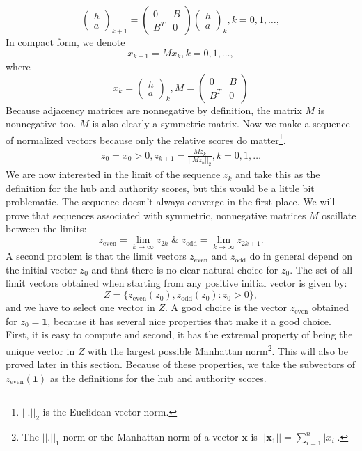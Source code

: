 \documentclass[a4paper,11pt]{report}
\begin{document}
$$\begin{pmatrix} 
h\\
a
\end{pmatrix}_{k+1} = \begin{pmatrix} 
0 & B\\
B^T & 0
\end{pmatrix} \begin{pmatrix} 
h\\
a
\end{pmatrix}_{k}, k = 0, 1,\ldots,$$
In compact form, we denote
$$x_{k+1} = Mx_k, k= 0,1,\ldots,$$
where 
$$x_k = \begin{pmatrix} 
h\\
a
\end{pmatrix}_{k}, M =  \begin{pmatrix} 
0 & B\\
B^T & 0
\end{pmatrix}$$
Because adjacency matrices are nonnegative by definition, the matrix $M$ is 
nonnegative too. $M$ is also clearly a symmetric matrix. Now we make a sequence 
of normalized vectors because only the relative scores do matter\footnote{$||.||_2$ is the Euclidean vector norm.}. 
\begin{eqnarray}\label{sequencezk}
  z_0 = x_0 > 0, z_{k+1} = \frac{Mz_k}{||Mz_k||_2}, k = 0,1,\ldots
\end{eqnarray}
We are now interested in the limit of the sequence $z_k$ and take this as the definition for
the hub and authority scores, but this would be a little bit problematic. The sequence doesn't always converge in the first place. We will prove that 
sequences associated with symmetric, nonnegative matrices $M$ oscillate between the 
limits:
$$z_{\text{even}} = \lim_{k \to \infty} z_{2k} \; \& \; z_{\text{odd}} = \lim_{k \to \infty} z_{2k+1}.$$
A second problem is that the limit vectors $z_{\text{even}}$ and $z_{\text{odd}}$ 
do in general depend on the initial vector $z_0$ and that there is no clear 
natural choice for $z_0$. The set of all limit vectors obtained when starting 
from any positive initial vector is given by:
$$Z = \{z_{\text{even}}(z_0), z_{\text{odd}}(z_0): z_0 > 0\},$$
and we have to select one vector in $Z$. A good choice is the vector $z_{\text{even}}$ 
obtained for $z_0 = \mathbf{1}$, because it has several nice properties that make it a good choice. First, it is easy to compute and second, it has the extremal property of being 
the unique vector in $Z$ with the largest possible Manhattan norm\footnote{The 
$||.||_1$-norm or the Manhattan norm of a vector $\mathbf{x}$ is 
$||\mathbf{x}_1|| = \sum^n_{i=1} |x_i|.$}. This will also be proved later in this section.
Because of these properties, we take the subvectors of $z_{\text{even}}(\mathbf{1})$ 
as the definitions for the hub and authority scores. \\
\end{document}
